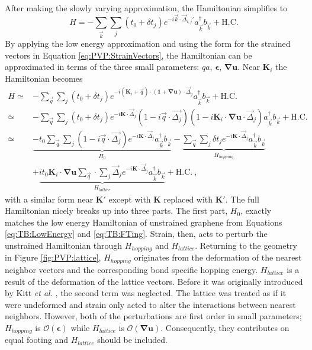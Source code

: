 After making the slowly varying approximation, the Hamiltonian simplifies to
\begin{equation*}
    H=-\sum_{\vec{k}} \sum_{j} \left( t_0+\delta t_j \right)
    e^{-i\vec{k}\cdot \vec{\Delta}_{i,j}'}
    a_{\vec{k}}^{\dagger} b_{\vec{k}} +\text{H.C.}
\end{equation*}
By applying the low energy approximation and using the form for the strained vectors in Equation \ref{eq:PVP:StrainVectors}, the Hamiltonian can be approximated in terms of the three small parameters: $qa$, $\bm{\epsilon}$, $\bm{\nabla u}$.
Near $\bm{K}_i$ the Hamiltonian becomes 
\begin{align*}
  H\simeq& -\sum_{\vec{q}} \sum_{j} \left( t_0+\delta t_j \right)
    e^{-i (\bm{K}_i+\vec{q}) \cdot (\bm{1}+\bm{\nabla u}) \cdot \vec{\Delta}_{j}}
    a_{\vec{k}}^{\dagger} b_{\vec{k}} +\text{H.C.} \\
   \simeq& -\sum_{\vec{q}} \sum_{j} \left( t_0+\delta t_j \right) e^{-i \bm{K} \cdot \vec{\Delta}_j}
    (1-i \vec{q} \cdot \vec{\Delta_j}) (1-i\bm{K}_i\cdot \bm{\nabla u} \cdot \vec{\Delta}_j)
    a_{\vec{k}}^{\dagger} b_{\vec{k}} +\text{H.C.} \\
   \simeq& 
    \underbrace{-t_0 \sum_{\vec{q}} \sum_{j} (1-i\vec{q} \cdot \vec{\Delta_j}) e^{-i \bm{K} \cdot \vec{\Delta}_j} a_{\vec{k}}^{\dagger}b_{\vec{k}}}_{H_0}
    -\underbrace{\sum_{\vec{q}} \sum_{j} \delta t_j e^{-i \bm{K} \cdot \vec{\Delta}_j} a_{\vec{k}}^{\dagger}b_{\vec{k}}}_{H_{hopping}} \\
    &+\underbrace{i t_0 \bm{K}_i \cdot \bm{\nabla u} \sum_{\vec{q}} \cdot \sum_{j} \vec{\Delta}_j e^{-i \bm{K} \cdot \vec{\Delta}_j} a_{\vec{k}}^{\dagger}b_{\vec{k}}}_{H_{lattice}}
    +\text{H.C.} \ ,
\end{align*}
with a similar form near $\bm{K'}$ except with $\bm{K}$ replaced with $\bm{K'}$.
The full Hamiltonian nicely breaks up into three parts.
The first part, $H_0$, exactly matches the low energy Hamiltonian of unstrained graphene from Equations \ref{eq:TB:LowEnergy} and \ref{eq:TB:FTing}.
Strain, then, acts to perturb the unstrained Hamiltonian through $H_{hopping}$ and $H_{lattice}$.
Returning to the geometry in Figure \ref{fig:PVP:lattice}, $H_{hopping}$ originates from the deformation of the nearest neighbor vectors and the corresponding bond specific hopping energy.
$H_{lattice}$ is a result of the deformation of the lattice vectors.
Before it was originally introduced by Kitt \textit{et al.} \cite{Kitt2012}, the second term was neglected.
The lattice was treated as if it were undeformed and strain only acted to alter the interactions between nearest neighbors.
However, both of the perturbations are first order in small parameters; $H_{hopping}$ is $\mathcal{O}(\bm{\epsilon})$ while $H_{lattice}$ is $\mathcal{O}(\bm{\nabla u})$.
Consequently, they contributes on equal footing and $H_{lattice}$ should be included.

